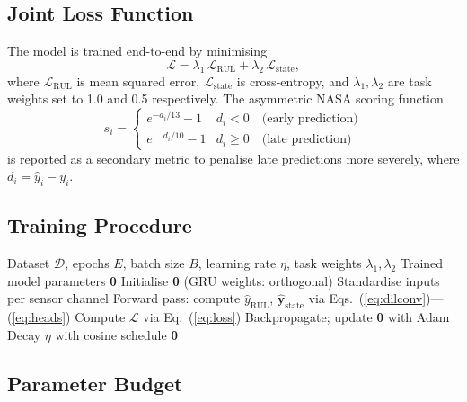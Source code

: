 \documentclass[AMA,Times1COL]{WileyNJDv5}
\begin{document}
\subsection{Joint Loss Function}\label{sec:arch:loss}
The model is trained end-to-end by minimising
\begin{equation}\label{eq:loss}
 \mathcal{L} = \lambda_1 \, \mathcal{L}_{\text{RUL}}
 + \lambda_2 \, \mathcal{L}_{\text{state}},
\end{equation}
where $\mathcal{L}_{\text{RUL}}$ is mean squared error,
$\mathcal{L}_{\text{state}}$ is cross-entropy, and
$\lambda_1, \lambda_2$ are task weights set to 1.0 and 0.5 respectively.
The asymmetric NASA scoring function
\begin{equation}\label{eq:nasa}
 s_i =
\begin{cases}
 e^{-d_i / 13} - 1 & d_i < 0 \quad \text{(early prediction)}\\
 e^{\phantom{-}d_i / 10} - 1 & d_i \geq 0 \quad \text{(late prediction)}
\end{cases}
\end{equation}
is reported as a secondary metric to penalise late predictions more
severely, where $d_i = \hat{y}_i - y_i$.

\subsection{Training Procedure}\label{sec:arch:training}
\begin{algorithm}[!h]
\caption{NanoSentry training procedure}\label{alg:training}
\begin{algorithmic}[1]
\Require Dataset $\mathcal{D}$, epochs $E$, batch size $B$,
 learning rate $\eta$, task weights $\lambda_1, \lambda_2$
\Ensure Trained model parameters $\boldsymbol{\theta}$
\State Initialise $\boldsymbol{\theta}$ (GRU weights: orthogonal)
\State Standardise inputs per sensor channel
 \State Forward pass: compute $\hat{y}_{\text{RUL}}$,
 $\hat{\mathbf{y}}_{\text{state}}$ via Eqs.\ (\ref{eq:dilconv})---(\ref{eq:heads})
 \State Compute $\mathcal{L}$ via Eq.\ (\ref{eq:loss})
 \State Backpropagate; update $\boldsymbol{\theta}$ with Adam
 \EndFor
 \State Decay $\eta$ with cosine schedule
\EndFor
\State \Return $\boldsymbol{\theta}$
\end{algorithmic}
\end{algorithm}

\subsection{Parameter Budget}\label{sec:arch:params}
\end{document}
